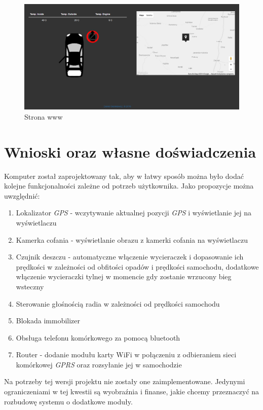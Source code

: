 \documentclass{xmgr}
\begin{document}
\begin{figure}[!h]
    \centering
    	\includegraphics[height=0.3\textheight]{images/www.png}
    \caption{Strona www}
\end{figure}

\section{Wnioski oraz własne doświadczenia}
Komputer został zaprojektowany tak, aby w łatwy sposób można było dodać kolejne funkcjonalności zależne od potrzeb użytkownika. Jako propozycje można uwzględnić:
\begin{enumerate}
	\item Lokalizator \emph{GPS} - wczytywanie aktualnej pozycji \emph{GPS} i wyświetlanie jej na wyświetlaczu
	\item Kamerka cofania - wyświetlanie obrazu z kamerki cofania na wyświetlaczu
	\item Czujnik deszczu - automatyczne włączenie wycieraczek i dopasowanie ich prędkości w zależności od obfitości opadów i prędkości samochodu, dodatkowe włączenie wycieraczki tylnej w momencie gdy zostanie wrzucony bieg wsteczny
	\item Sterowanie głośnością radia w zależności od prędkości samochodu
	\item Blokada immobilizer
	\item Obsługa telefonu komórkowego za pomocą bluetooth
	\item Router - dodanie modułu karty WiFi w połączeniu z odbieraniem sieci komórkowej \emph{GPRS} oraz rozsyłanie jej w samochodzie
\end{enumerate}
Na potrzeby tej wersji projektu nie zostały one zaimplementowane. Jedynymi ograniczeniami w tej kwestii są wyobraźnia i finanse, jakie chcemy przeznaczyć na rozbudowę systemu o dodatkowe moduły.
\end{document}
